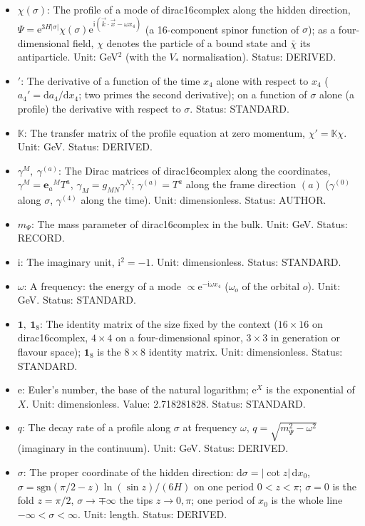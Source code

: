 \documentclass[
  10pt,
]{article}
\providecommand{\tightlist}{%
  \setlength{\itemsep}{0pt}\setlength{\parskip}{0pt}}
\begin{document}
\begin{itemize}
\tightlist
\item
  \(\chi(\sigma)\): The profile of a mode of dirac16complex along the
  hidden direction,
  \(\Psi = \mathrm{e}^{3H\lvert\sigma\rvert}\chi(\sigma)\mathrm{e}^{\mathrm{i}(\vec k\cdot\vec x - \omega x_4)}\)
  (a 16-component spinor function of \(\sigma\)); as a four-dimensional
  field, \(\chi\) denotes the particle of a bound state and \(\bar\chi\)
  its antiparticle. Unit: GeV\(^{2}\) (with the \(V_*\) normalisation).
  Status: DERIVED.
\item
  \({}'\): The derivative of a function of the time \(x_4\) alone with
  respect to \(x_4\) (\(a_4' = \mathrm{d}a_4/\mathrm{d}x_4\); two primes
  the second derivative); on a function of \(\sigma\) alone (a profile)
  the derivative with respect to \(\sigma\). Status: STANDARD.
\item
  \(\mathbb{K}\): The transfer matrix of the profile equation at zero
  momentum, \(\chi' = \mathbb{K}\chi\). Unit: GeV. Status: DERIVED.
\item
  \(\gamma^M,\ \gamma^{(a)}\): The Dirac matrices of dirac16complex
  along the coordinates, \(\gamma^M = \mathbf{e}_a{}^MT^a\),
  \(\gamma_M = g_{MN}\gamma^N\); \(\gamma^{(a)} = T^a\) along the frame
  direction \((a)\) (\(\gamma^{(0)}\) along \(\sigma\), \(\gamma^{(4)}\)
  along the time). Unit: dimensionless. Status: AUTHOR.
\item
  \(m_\Psi\): The mass parameter of dirac16complex in the bulk. Unit:
  GeV. Status: RECORD.
\item
  \(\mathrm{i}\): The imaginary unit, \(\mathrm{i}^2 = -1\). Unit:
  dimensionless. Status: STANDARD.
\item
  \(\omega\): A frequency: the energy of a mode
  \(\propto \mathrm{e}^{-\mathrm{i}\omega x_4}\) (\(\omega_o\) of the
  orbital \(o\)). Unit: GeV. Status: STANDARD.
\item
  \(\mathbf{1},\ \mathbf{1}_8\): The identity matrix of the size fixed
  by the context (\(16 \times 16\) on dirac16complex, \(4 \times 4\) on
  a four-dimensional spinor, \(3 \times 3\) in generation or flavour
  space); \(\mathbf{1}_8\) is the \(8 \times 8\) identity matrix. Unit:
  dimensionless. Status: STANDARD.
\item
  \(\mathrm{e}\): Euler's number, the base of the natural logarithm;
  \(\mathrm{e}^{X}\) is the exponential of \(X\). Unit: dimensionless.
  Value: 2.718281828. Status: STANDARD.
\item
  \(q\): The decay rate of a profile along \(\sigma\) at frequency
  \(\omega\), \(q = \sqrt{m_\Psi^2 - \omega^2}\) (imaginary in the
  continuum). Unit: GeV. Status: DERIVED.
\item
  \(\sigma\): The proper coordinate of the hidden direction:
  \(\mathrm{d}\sigma = \lvert\cot z\rvert\,\mathrm{d}x_0\),
  \(\sigma = \mathrm{sgn}(\pi/2 - z)\ln(\sin z)/(6H)\) on one period
  \(0 < z < \pi\); \(\sigma = 0\) is the fold \(z = \pi/2\),
  \(\sigma \to \mp\infty\) the tips \(z \to 0, \pi\); one period of
  \(x_0\) is the whole line \(-\infty < \sigma < \infty\). Unit: length.
  Status: DERIVED.
\end{itemize}
\end{document}
